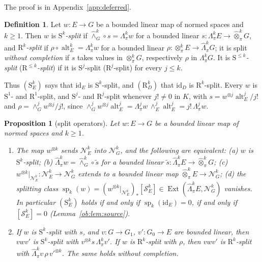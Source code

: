 \documentclass[11pt]{amsart}
\newtheorem{proposition}[theorem]{Proposition}
\theoremstyle{definition}
\newtheorem{definition}[theorem]{Definition}
\theoremstyle{remark}
\numberwithin{equation}{section}
\newcommand{\id}{\mathrm{id}}
\theoremstyle{plain}
\theoremstyle{definition}
\theoremstyle{plain}
\newcommand{\alt}{\operatorname{alt}}
\newcommand{\Ext}{\operatorname{Ext}}
\newcommand{\cN}{\mathcal N}
\newcommand{\cS}{\mathcal S}
\begin{document}
The proof is in Appendix~\ref{app:deferred}.

\begin{definition}\label{ob:def:split-operators}
Let $w\colon E\to G$ be a bounded linear map of normed spaces and $k\ge1$. Then $w$ is \emph{$\mathrm S^k$-split} if
$\widehat\wedge^k_G\circ s=\Lambda^k_\pi w$ for a bounded linear $s\colon\Lambda^k_\pi E\to\widehat\otimes^k_\pi G$, and
\emph{$\mathrm R^k$-split} if $\rho\circ\alt^k_E=\Lambda^k_\pi w$ for a bounded linear
$\rho\colon\otimes^k_\pi E\to\widehat\Lambda^k_\pi G$; it is split \emph{without completion} if $s$ takes values in
$\otimes^k_\pi G$, respectively $\rho$ in $\Lambda^k_\pi G$. It is \emph{$\mathrm S^{\le k}$-split}
(\emph{$\mathrm R^{\le k}$-split}) if it is $\mathrm S^j$-split ($\mathrm R^j$-split) for every $j\le k$.
\end{definition}

Thus $(\mathrm S^k_E)$ says that $\id_E$ is $\mathrm S^k$-split, and $(\mathrm R^k_D)$ that $\id_D$ is
$\mathrm R^k$-split. Every $w$ is $\mathrm S^1$- and $\mathrm R^1$-split, and $\mathrm S^j$- and $\mathrm R^j$-split
whenever $j!\ne0$ in $K$, with $s=w^{\otimes j}\alt^j_E/j!$ and $\rho=\wedge^j_Gw^{\otimes j}/j!$, since
$\wedge^j_Gw^{\otimes j}\alt^j_E=\Lambda^j_\pi w\,\wedge^j_E\alt^j_E=j!\,\Lambda^j_\pi w$.

\begin{proposition}[split operators]\label{ob:prop:split-operators}
Let $w\colon E\to G$ be a bounded linear map of normed spaces and $k\ge1$.
\begin{enumerate}
\item The map $w^{\otimes k}$ sends $\cN^k_E$ into $\cN^k_G$, and the following are equivalent: (a) $w$ is
$\mathrm S^k$-split; (b) $\widehat\Lambda^k_\pi w=\widehat\wedge^k_G\circ\tilde s$ for a bounded linear
$\tilde s\colon\widehat\Lambda^k_\pi E\to\widehat\otimes^k_\pi G$; (c) $w^{\otimes k}|_{\cN^k_E}\colon\cN^k_E\to\cN^k_G$
extends to a bounded linear map $\widehat\otimes^k_\pi E\to\cN^k_G$; (d) the \emph{splitting class}
$\operatorname{sp}_k(w)=(w^{\otimes k}|_{\cN^k_E})_*[\cS^k_E]\in\Ext(\widehat\Lambda^k_\pi E,\cN^k_G)$ vanishes. In
particular $(\mathrm S^k_E)$ holds if and only if $\operatorname{sp}_k(\id_E)=0$, if and only if $[\cS^k_E]=0$
(Lemma~\ref{ob:lem:source}).
\item If $w$ is $\mathrm S^k$-split with $s$, and $v\colon G\to G_1$, $v'\colon G_0\to E$ are bounded linear, then $vwv'$
is $\mathrm S^k$-split with $v^{\otimes k}s\,\Lambda^k_\pi v'$. If $w$ is $\mathrm R^k$-split with $\rho$, then $vwv'$ is
$\mathrm R^k$-split with $\widehat\Lambda^k_\pi v\,\rho\,v'^{\otimes k}$. The same holds without completion.
\end{enumerate}
\end{proposition}
\end{document}

